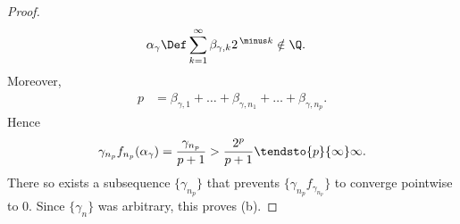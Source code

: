 \begin{proof}
%
\begin{align}
  \alpha_\gamma & \Def \sum_{k=1}^\infty \beta_{\gamma, k} 2^{\, \minus k} \notin \Q.
\end{align}
%
Moreover, %
%
\begin{align}
  p &= \beta_{\gamma, 1} + \dots + \beta_{\gamma, n_1} + \dots + \beta_{\gamma, n_p}.
\end{align}
%
Hence %
%
\begin{align}
  \gamma_{n_p} f_{n_{p}}(\alpha_\gamma) 
    = \frac{\gamma_{n_p}}{p+1}  
    > \frac{2^p}{p+1}
      \tendsto{p}{\infty} \infty.
\end{align}
%
There so exists a subsequence $\{\gamma_{n_p}\}$ that prevents %
%
$\{\gamma_{n_p} f_{\gamma_{n_p}}\}$ %
%
to converge pointwise to $0$. %
Since $\{\gamma_{n}\}$ was arbitrary, this proves (b).
\end{proof}
